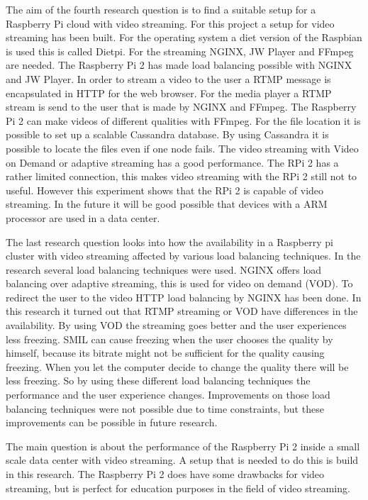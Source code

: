 \documentclass{sig-alternate-br}
\begin{document}
The aim of the fourth research question is to find a suitable setup for a Raspberry Pi cloud with video streaming. For this project a setup for video streaming has been built. For the operating system a diet version of the Raspbian is used this is called Dietpi. For the streaming NGINX, JW Player and FFmpeg are needed. The Raspberry Pi 2 has made load balancing possible with NGINX and JW Player. In order to stream a video to the user a RTMP message is encapsulated in HTTP for the web browser.  For the media player a RTMP stream is send to the user that is made by NGINX and FFmpeg.
The Raspberry Pi 2 can make videos of different qualities with FFmpeg. For the file location it is possible to set up a scalable Cassandra database. By using Cassandra it is possible to locate the files even if one node fails.
The video streaming with Video on Demand or adaptive streaming has a good performance. The RPi 2 has a rather limited connection, this makes video streaming with the RPi 2 still not to useful. However this experiment shows that the RPi 2 is capable of video streaming. In the future it will be good possible that devices with a ARM processor are used in a data center. 

The last research question looks into how the availability in a Raspberry pi cluster with video streaming affected by various load balancing techniques. In the research several load balancing techniques were used. NGINX offers load balancing over adaptive streaming, this is used for video on demand (VOD). To redirect the user to the video HTTP load balancing by NGINX has been done. In this research it turned out that RTMP streaming or VOD have differences in the availability. By using VOD the streaming goes better and the user experiences less freezing. SMIL can cause freezing when the user chooses the quality by himself, because its bitrate might not be sufficient for the quality causing freezing. When you let the computer decide to change the quality there will be less freezing. So by using these different load balancing techniques the performance and the user experience changes.  Improvements on those load balancing techniques were not possible due to time constraints, but these improvements can be possible in future research. 

The main question is about the performance of the Raspberry Pi 2 inside a small scale data center with video streaming. A setup that is needed to do this is build in this research. 
The Raspberry Pi 2 does have some drawbacks for video streaming, but is perfect for education purposes in the field of video streaming. 
	
\end{document}
